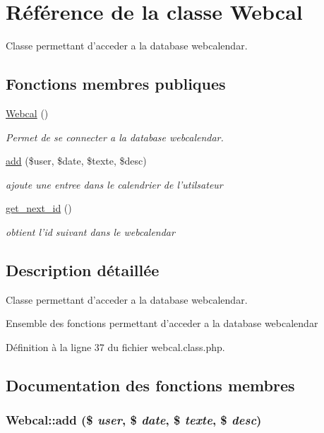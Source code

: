 \hypertarget{classWebcal}{
\section{R\'{e}f\'{e}rence de la classe Webcal}
\label{classWebcal}
}
Classe permettant d'acceder a la database webcalendar.  


\subsection*{Fonctions membres publiques}
\begin{CompactItemize}
\item 
\hypertarget{classWebcal_a0}{
\hyperlink{classWebcal_a0}{Webcal} ()}
\label{classWebcal_a0}

\begin{CompactList}\small\item\em Permet de se connecter a la database webcalendar. \item\end{CompactList}\item 
\hyperlink{classWebcal_a1}{add} (\$user, \$date, \$texte, \$desc)
\begin{CompactList}\small\item\em ajoute une entree dans le calendrier de l'utilsateur \item\end{CompactList}\item 
\hyperlink{classWebcal_a2}{get\_\-next\_\-id} ()
\begin{CompactList}\small\item\em obtient l'id suivant dans le webcalendar \item\end{CompactList}\end{CompactItemize}


\subsection{Description d\'{e}taill\'{e}e}
Classe permettant d'acceder a la database webcalendar. 

Ensemble des fonctions permettant d'acceder a la database webcalendar 



D\'{e}finition \`{a} la ligne 37 du fichier webcal.class.php.

\subsection{Documentation des fonctions membres}
\hypertarget{classWebcal_a1}{
\subsubsection[add]{\setlength{\rightskip}{0pt plus 5cm}Webcal::add (\$ {\em user}, \$ {\em date}, \$ {\em texte}, \$ {\em desc})}}
\label{classWebcal_a1}


